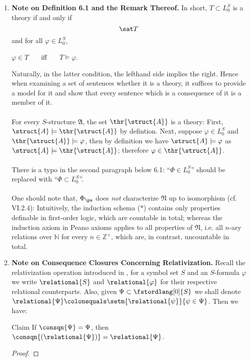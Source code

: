 \begin{enumerate}[1.]
\item \textbf{Note on Definition 6.1 and the Remark Thereof.} In short, $T \subset L^S_0$ is a theory if and only if
\[
\sat T
\]
and for all $\varphi \in L^S_0$,
\begin{center}
$\varphi \in T$ \ \ \ iff \ \ \ $T \models \varphi$.
\end{center}
Naturally, in the latter condition, the lefthand side implies the right. Hence when examining a set of sentences whether it is a theory, it suffices to provide a model for it and show that every sentence which is a consequence of it is a member of it.\\
\ \\
For every $S$-structure $\mathfrak{A}$, the set $\thr{\struct{A}}$ is a theory: First, $\struct{A} \models \thr{\struct{A}}$ by defintion. Next, suppose $\varphi \in L^S_0$ and $\thr{\struct{A}} \models \varphi$, then by definition we have $\struct{A} \models \varphi$ as $\struct{A} \models \thr{\struct{A}}$; therefore $\varphi \in \thr{\struct{A}}$.\\
\ \\
There is a typo in the second paragraph below 6.1: ``$\Phi \in L^S_0$'' should be replaced with ``$\Phi \subset L^S_0$''.\\
\ \\
One should note that, $\Phi_\pa$ does \emph{not} characterize $\mathfrak{N}$ up to isomorphism (cf. VI.2.4): Intuitively, the induction schema ($*$) contains only properties definable in first-order logic, which are countable in total; whereas the induction axiom in Peano axioms applies to all properties of $\mathfrak{N}$, i.e. all $n$-ary relations over $\mathbb{N}$ for every $n \in \mathbb{Z}^+$, which are, in contrast, uncountable in total.
%
\item \textbf{Note on Consequence Closures Concerning Relativization.} Recall the relativization operation introduced in , for a symbol set $S$ and an $S$-formula $\varphi$ we write $\relational{S}$ and $\relational{\varphi}$ for their respective relational counterparts. Also, given $\Psi \subset \fstordlang[0]{S}$ we shall denote $\relational{\Psi} \colonequals \setm{\relational{\psi}}{\psi \in \Psi}$.
Then we have:\medskip\\
\begin{theorem}{Claim}
If $\consqn{\Psi} = \Psi$, then $\consqn{(\relational{\Psi})} = \relational{\Psi}$.
\end{theorem}
\begin{proof}

\end{proof}
\end{enumerate}
